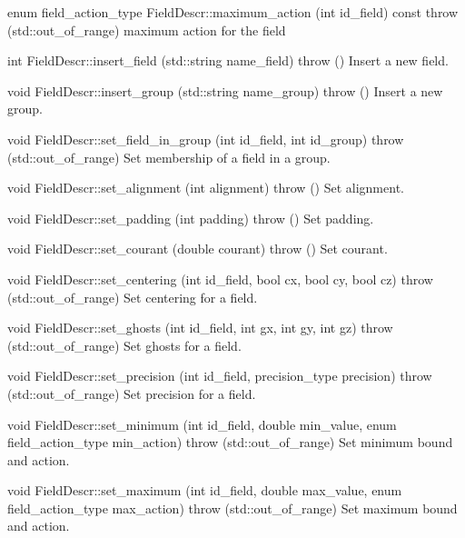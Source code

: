 \documentclass{article}
\begin{document}
enum field\_action\_type 	FieldDescr::maximum\_action (int id\_field) const throw (std::out\_of\_range)
 	maximum action for the field

int 	FieldDescr::insert\_field (std::string name\_field) throw ()
 	Insert a new field.

void 	FieldDescr::insert\_group (std::string name\_group) throw ()
 	Insert a new group.

void 	FieldDescr::set\_field\_in\_group (int id\_field, int id\_group) throw (std::out\_of\_range)
 	Set membership of a field in a group.

void 	FieldDescr::set\_alignment (int alignment) throw ()
 	Set alignment.

void 	FieldDescr::set\_padding (int padding) throw ()
 	Set padding.

void 	FieldDescr::set\_courant (double courant) throw ()
 	Set courant.

void 	FieldDescr::set\_centering (int id\_field, bool cx, bool cy, bool cz) throw (std::out\_of\_range)
 	Set centering for a field.

void 	FieldDescr::set\_ghosts (int id\_field, int gx, int gy, int gz) throw (std::out\_of\_range)
 	Set ghosts for a field.

void 	FieldDescr::set\_precision (int id\_field, precision\_type precision) throw (std::out\_of\_range)
 	Set precision for a field.

void 	FieldDescr::set\_minimum (int id\_field, double min\_value, enum field\_action\_type min\_action) throw (std::out\_of\_range)
 	Set minimum bound and action.

void 	FieldDescr::set\_maximum (int id\_field, double max\_value, enum field\_action\_type max\_action) throw (std::out\_of\_range)
 	Set maximum bound and action. 



\subsubsection{}

\subsubsection{}

\subsection{}
\end{document}

